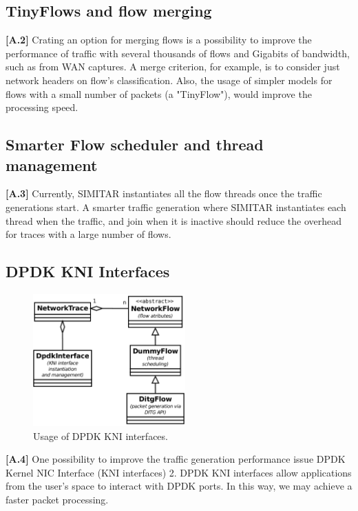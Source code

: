 \subsection{TinyFlows and flow merging}

\textbf{[A.2]} Crating an option for merging flows is a possibility to improve the performance of traffic with several thousands of flows and Gigabits of bandwidth, such as from WAN captures. A merge criterion, for example, is to consider just network headers on flow’s classification. Also, the usage of simpler models for flows with a small number of packets (a "TinyFlow"), would improve the processing speed.

\subsection{Smarter Flow scheduler and thread management}

\textbf{[A.3]} Currently, SIMITAR instantiates all the flow threads once the traffic generations start.  A smarter traffic generation where SIMITAR instantiates each thread when the traffic, and join when it is inactive should reduce the overhead for traces with a large number of flows. 

\subsection{DPDK KNI Interfaces}

\begin{figure}[!ht]
    \centering
    \includegraphics[height=2.0in]{figures/ch6/dpdk-interface.pdf}
    \caption{Usage of DPDK KNI interfaces.}
    \label{fig:dpdk-kni}
\end{figure}

\textbf{[A.4]} One possibility to improve the traffic generation performance issue DPDK Kernel NIC Interface (\acrshort{KNI} interfaces) 2. DPDK KNI interfaces allow applications from the user’s space to interact with DPDK ports. In this way, we may achieve a faster packet processing.

